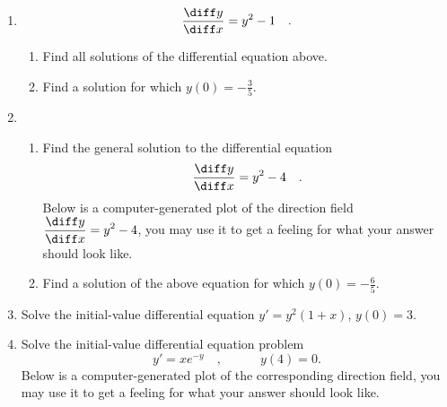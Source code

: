 \begin{multicols}{2}
\begin{enumerate}[ref={\fcProblemRef}]
\item 
\begin{equation}\label{eqDFQseparable-yprime=ysquared-1}
\frac{\diff y}{\diff x}= y^2-1\quad .
\end{equation}
\begin{enumerate}[ref={\fcSubProblemRef}]
\item \label{problemDFQseparable-yprime=ysquared-1-part1} Find all solutions of the differential equation above.
\item \label{problemDFQseparable-yprime=ysquared-1-part2} Find a solution for which $y(0)=-\frac{3}{5}$.
\end{enumerate}
\item \begin{enumerate}
\item Find the general solution to the differential equation
\[
\frac{\diff y}{\diff x}= y^2-4\quad .
\]
Below is a computer-generated plot of the direction field  $\displaystyle \frac{\diff y}{\diff x}=y^2-4$, you may use it to get a feeling for what your answer should look like.

\item {Find a solution of the above equation for which $ y(0)= -\frac{6}{5}$.}
\end{enumerate}

\item 
\label{problemy'=y^2(1+x),y(0)=3}
Solve the initial-value differential equation $\displaystyle y' = y^2(1+x)$, $y(0) = 3$.

\item Solve the initial-value differential equation problem
\[
y'=xe^{-y}
\quad,\quad  \quad \quad y(4)=0.
\]
Below is a computer-generated plot of the corresponding direction field, you may use it to get a feeling for what your answer should look like.



\end{enumerate}
\end{multicols}

